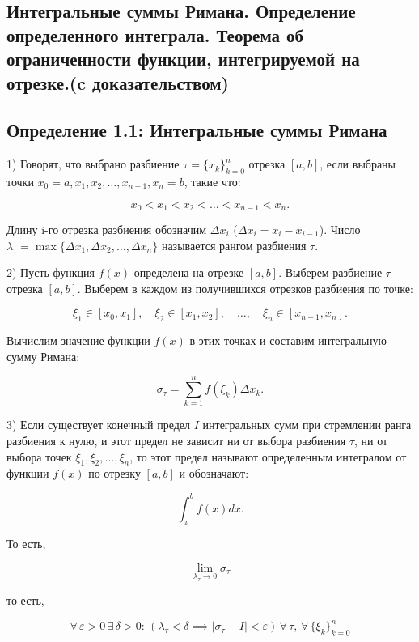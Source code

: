 {
\subsection{Интегральные суммы Римана. Определение определенного интеграла. Теорема об ограниченности функции, интегрируемой на отрезке.(c доказательством)}

\subsection*{Определение 1.1: Интегральные суммы Римана}

1) Говорят, что выбрано разбиение \( \tau = \{x_k\}_{k=0}^{n} \) отрезка \( [a, b] \), если выбраны точки \( x_0 = a, x_1, x_2, \dots, x_{n-1}, x_n = b \), такие что:


\[
x_0 < x_1 < x_2 < \dots < x_{n-1} < x_n.
\]

Длину i-го отрезка разбиения обозначим \( \Delta x_i \) (\( \Delta x_i = x_i - x_{i-1} \)). Число \( \lambda_\tau = \max \{\Delta x_1, \Delta x_2, \dots, \Delta x_n\} \) называется рангом разбиения \( \tau \).

2) Пусть функция \( f(x) \) определена на отрезке \( [a, b] \). Выберем разбиение \( \tau \) отрезка \( [a, b] \). Выберем в каждом из получившихся отрезков разбиения по точке:

\[
\xi_1 \in [x_0, x_1], \quad \xi_2 \in [x_1, x_2], \quad \dots, \quad \xi_n \in [x_{n-1}, x_n].
\]

Вычислим значение функции \( f(x) \) в этих точках и составим интегральную сумму Римана:

\[
\sigma_\tau = \sum_{k=1}^{n} f(\xi_k) \Delta x_k.
\]

3) Если существует конечный предел \( I \) интегральных сумм при стремлении ранга разбиения к нулю, и этот предел не зависит ни от выбора разбиения \( \tau \), ни от выбора точек \( \xi_1, \xi_2, \dots, \xi_n \), то этот предел называют определенным интегралом от функции \( f(x) \) по отрезку \( [a, b] \) и обозначают:

\[
\int_a^b f(x)dx.
\]

То есть, 


\[
\lim_{\lambda_{\tau} \to 0} \sigma_{\tau}
\]


то есть,

\[
\forall \, \varepsilon > 0 \, \exists \, \delta > 0: \, \left( \lambda_{\tau} < \delta \implies |\sigma_{\tau} - I| < \varepsilon \right) \, \forall \, \tau, \, \forall \, \{ \xi_{k} \}_{k=0}^{n}
\]

}
